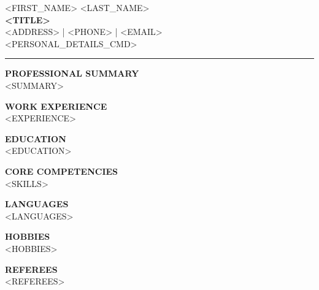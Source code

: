 \documentclass[11pt,a4paper]{article}
\begin{document}
\begin{center}
    {\Huge \MakeUppercase{<FIRST_NAME> <LAST_NAME>}} \\ \vspace{2mm}
    {\large \textbf{<TITLE>}} \\ \vspace{2mm}
    {<ADDRESS> | <PHONE> | <EMAIL>} \\
    {<PERSONAL_DETAILS_CMD>}
\end{center}

\vspace{3mm}
\noindent\textcolor{accent}{\rule{\textwidth}{1pt}}

\vspace{5mm}
\noindent\textbf{\large PROFESSIONAL SUMMARY} \vspace{2mm} \\
<SUMMARY>

\vspace{5mm}
\noindent\textbf{\large WORK EXPERIENCE} \vspace{2mm} \\
<EXPERIENCE>

\vspace{5mm}
\noindent\textbf{\large EDUCATION} \vspace{2mm} \\
<EDUCATION>

\vspace{5mm}
\noindent\textbf{\large CORE COMPETENCIES} \vspace{2mm} \\
<SKILLS>

\vspace{5mm}
\noindent\textbf{\large LANGUAGES} \vspace{2mm} \\
<LANGUAGES>

\vspace{5mm}
\noindent\textbf{\large HOBBIES} \vspace{2mm} \\
<HOBBIES>

\vspace{5mm}
\noindent\textbf{\large REFEREES} \vspace{2mm} \\
<REFEREES>
\end{document}
